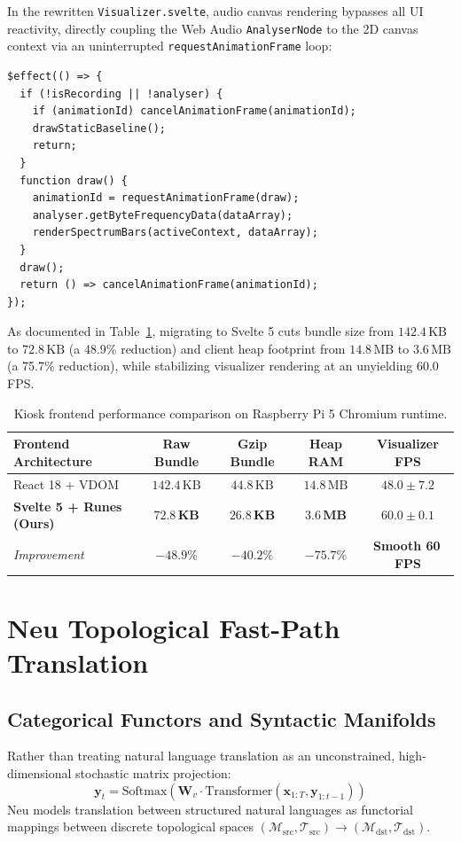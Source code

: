 \documentclass[11pt]{article}
\begin{document}
In the rewritten \texttt{Visualizer.svelte}, audio canvas rendering bypasses all UI reactivity, directly coupling the Web Audio \texttt{AnalyserNode} to the 2D canvas context via an uninterrupted \texttt{requestAnimationFrame} loop:
\begin{lstlisting}
$effect(() => {
  if (!isRecording || !analyser) {
    if (animationId) cancelAnimationFrame(animationId);
    drawStaticBaseline();
    return;
  }
  function draw() {
    animationId = requestAnimationFrame(draw);
    analyser.getByteFrequencyData(dataArray);
    renderSpectrumBars(activeContext, dataArray);
  }
  draw();
  return () => cancelAnimationFrame(animationId);
});
\end{lstlisting}

As documented in Table~\ref{tab:kiosk_comparison}, migrating to Svelte 5 cuts bundle size from $142.4\,\text{KB}$ to $72.8\,\text{KB}$ (a 48.9\% reduction) and client heap footprint from $14.8\,\text{MB}$ to $3.6\,\text{MB}$ (a 75.7\% reduction), while stabilizing visualizer rendering at an unyielding 60.0 FPS.

\begin{table}[h!]
\centering
\small
\begin{tabular}{lcccc}
\toprule
\textbf{Frontend Architecture} & \textbf{Raw Bundle} & \textbf{Gzip Bundle} & \textbf{Heap RAM} & \textbf{Visualizer FPS} \\
\midrule
React 18 + VDOM & $142.4\,\text{KB}$ & $44.8\,\text{KB}$ & $14.8\,\text{MB}$ & $48.0 \pm 7.2$ \\
\textbf{Svelte 5 + Runes (Ours)} & $\mathbf{72.8\,\text{KB}}$ & $\mathbf{26.8\,\text{KB}}$ & $\mathbf{3.6\,\text{MB}}$ & $\mathbf{60.0 \pm 0.1}$ \\
\midrule
\textit{Improvement} & \textbf{$-48.9\%$} & \textbf{$-40.2\%$} & \textbf{$-75.7\%$} & \textbf{Smooth 60\,FPS} \\
\bottomrule
\end{tabular}
\caption{Kiosk frontend performance comparison on Raspberry Pi 5 Chromium runtime.}
\label{tab:kiosk_comparison}
\end{table}

\section{Neu Topological Fast-Path Translation}

\subsection{Categorical Functors and Syntactic Manifolds}
Rather than treating natural language translation as an unconstrained, high-dimensional stochastic matrix projection:
\begin{equation}
\mathbf{y}_t = \text{Softmax}\left(\mathbf{W}_v \cdot \text{Transformer}(\mathbf{x}_{1:T}, \mathbf{y}_{1:t-1})\right)
\end{equation}
Neu models translation between structured natural languages as functorial mappings between discrete topological spaces $(\mathcal{M}_{\text{src}}, \mathcal{T}_{\text{src}}) \to (\mathcal{M}_{\text{dst}}, \mathcal{T}_{\text{dst}})$.
\end{document}
